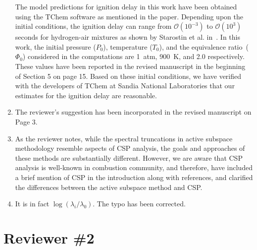 \documentclass[11pt,final]{article}
\newcommand{\referee}[1]{\vspace{.1ex}\noindent{\textcolor{blue}{#1}}}
\begin{document}
\begin{enumerate}[wide, labelwidth=!, labelindent=0pt]
The model predictions for ignition delay in this work have been obtained using the 
TChem software as mentioned in the paper.
Depending upon the initial conditions, the ignition delay can range from $\mathcal{O}(10^{-3})$
to $\mathcal{O}(10^3)$ seconds for hydrogen-air mixtures as shown by Starostin et al. in~\cite{Starostin:2011}.
In this work, the initial pressure ($P_0$), temperature ($T_0$), and
the equivalence ratio~($\Phi_0$) considered in the computations are 1~atm, 900~K, and 2.0
respectively. These values have been reported in the revised manuscript in the beginning of
Section 5 on page 15. Based on these initial conditions, we have verified with the developers of
TChem at Sandia National Laboratories that our estimates for the ignition delay are reasonable. 

\item \referee{p.3, line 36. I would call this the ``temperature exponent".}

The reviewer's suggestion has been incorporated in the revised manuscript on Page 3.

\item \referee{p.6, line 32. This is a spectral gap. Need to give credit to the
CSP community, although they consider spectral gaps in the nonlinear system,
while here the authors consider spectral gaps in C, which is related to the
system's response to varying model parameters.}

As the reviewer notes, while the spectral 
truncations in active subspace methodology resemble aspects of CSP analysis,
the goals and approaches of these methods are substantially different. However, 
we are aware that CSP analysis is well-known in combustion 
community, and therefore, have included a brief mention 
of CSP in the introduction along with references, and clarified the differences between 
the active subspace method and CSP. 

\item \referee{p. 16, Fig. 6. y-axis label. Probably $\lambda_i/\lambda_0$ as goes to 1 for i=1? Typo?}

It is in fact $\log(\lambda_i/\lambda_0)$. The typo has been corrected.



\end{enumerate}

\section*{Reviewer \#2}
\end{document}
